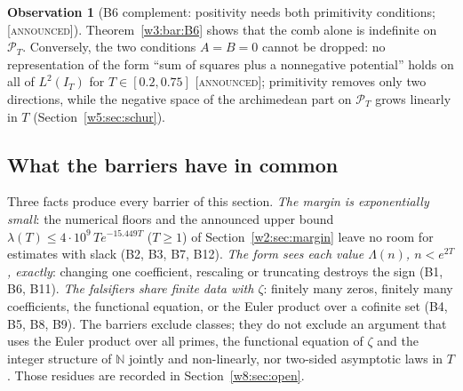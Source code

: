 \documentclass[11pt]{amsart}
\theoremstyle{definition}
\newtheorem{observation}[theorem]{Observation}
\theoremstyle{remark}
\numberwithin{equation}{section}
\newcommand{\N}{\mathbb{N}}
\newcommand{\IT}{I_T}                                  %
\newcommand{\PT}{\mathcal{P}_T}                        %
\newcommand{\lam}{\lambda(T)}                          %
\newcommand{\stag}[1]{\textsc{[#1]}}
\newcommand{\ANNOUNCED}{\stag{announced}}
\begin{document}
\begin{observation}[B6 complement: positivity needs both primitivity conditions; \ANNOUNCED]\label{w3:bar:B6b}
Theorem~\ref{w3:bar:B6} shows that the comb alone is indefinite on $\PT$. Conversely, the two conditions $A=B=0$
cannot be dropped: no representation of the form ``sum of squares plus a nonnegative potential'' holds on all of
$L^2(\IT)$ for $T\in[0.2,0.75]$ \ANNOUNCED; primitivity removes only two directions, while the negative space of
the archimedean part on $\PT$ grows linearly in $T$ (Section~\ref{w5:sec:schur}).
\end{observation}

\subsection{What the barriers have in common}\label{w3:subsec:mechanism}

Three facts produce every barrier of this section. \emph{The margin is exponentially small}: the numerical
floors and the announced upper bound $\lam\le4\cdot10^9\,Te^{-15.449T}$ ($T\ge1$) of Section~\ref{w2:sec:margin}
leave no room for estimates with slack (B2, B3, B7, B12). \emph{The form sees each value $\Lambda(n)$,
$n<e^{2T}$, exactly}: changing one coefficient, rescaling or truncating destroys the sign (B1, B6, B11).
\emph{The falsifiers share finite data with $\zeta$}: finitely many zeros, finitely many coefficients, the
functional equation, or the Euler product over a cofinite set (B4, B5, B8, B9). The barriers exclude classes;
they do not exclude an argument that uses the Euler product over all primes, the functional equation of $\zeta$
and the integer structure of $\N$ jointly and non-linearly, nor two-sided asymptotic laws in $T$. Those
residues are recorded in Section~\ref{w8:sec:open}.
\end{document}
